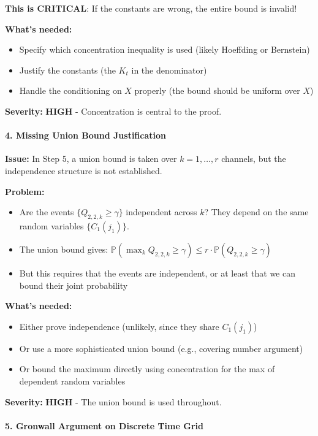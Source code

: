 \textbf{This is CRITICAL}: If the constants are wrong, the entire bound is invalid!

\textbf{What's needed:}
\begin{itemize}
\item Specify which concentration inequality is used (likely Hoeffding or Bernstein)
\item Justify the constants (the $K_t$ in the denominator)
\item Handle the conditioning on $X$ properly (the bound should be uniform over $X$)
\end{itemize}

\textbf{Severity:} \textbf{HIGH} - Concentration is central to the proof.

\paragraph*{4. Missing Union Bound Justification}

\textbf{Issue:} In Step 5, a union bound is taken over $k = 1, \ldots, r$ channels, but the independence structure is not established.

\textbf{Problem:}
\begin{itemize}
\item Are the events $\{Q_{2,2,k} \ge \gamma\}$ independent across $k$? They depend on the same random variables $\{C_1(j_1)\}$.
\item The union bound gives: $\mathbb{P}(\max_k Q_{2,2,k} \ge \gamma) \le r \cdot \mathbb{P}(Q_{2,2,k} \ge \gamma)$
\item But this requires that the events are independent, or at least that we can bound their joint probability
\end{itemize}

\textbf{What's needed:}
\begin{itemize}
\item Either prove independence (unlikely, since they share $C_1(j_1)$)
\item Or use a more sophisticated union bound (e.g., covering number argument)
\item Or bound the maximum directly using concentration for the max of dependent random variables
\end{itemize}

\textbf{Severity:} \textbf{HIGH} - The union bound is used throughout.

\paragraph*{5. Gronwall Argument on Discrete Time Grid}

